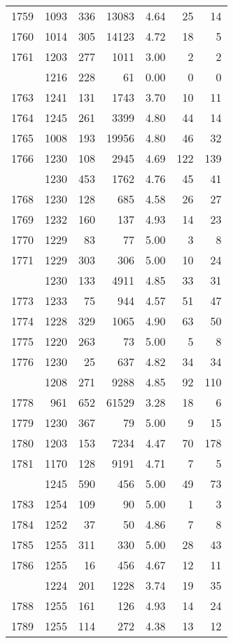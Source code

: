\documentclass[
]{article}
\begin{document}
\begin{table}
\begin{tabular}[t]{lrrrrrr}
1759 & 1093 & 336 & 13083 & 4.64 & 25 & 14\\
1760 & 1014 & 305 & 14123 & 4.72 & 18 & 5\\
1761 & 1203 & 277 & 1011 & 3.00 & 2 & 2\\
\addlinespace
1762 & 1216 & 228 & 61 & 0.00 & 0 & 0\\
1763 & 1241 & 131 & 1743 & 3.70 & 10 & 11\\
1764 & 1245 & 261 & 3399 & 4.80 & 44 & 14\\
1765 & 1008 & 193 & 19956 & 4.80 & 46 & 32\\
1766 & 1230 & 108 & 2945 & 4.69 & 122 & 139\\
\addlinespace
1767 & 1230 & 453 & 1762 & 4.76 & 45 & 41\\
1768 & 1230 & 128 & 685 & 4.58 & 26 & 27\\
1769 & 1232 & 160 & 137 & 4.93 & 14 & 23\\
1770 & 1229 & 83 & 77 & 5.00 & 3 & 8\\
1771 & 1229 & 303 & 306 & 5.00 & 10 & 24\\
\addlinespace
1772 & 1230 & 133 & 4911 & 4.85 & 33 & 31\\
1773 & 1233 & 75 & 944 & 4.57 & 51 & 47\\
1774 & 1228 & 329 & 1065 & 4.90 & 63 & 50\\
1775 & 1220 & 263 & 73 & 5.00 & 5 & 8\\
1776 & 1230 & 25 & 637 & 4.82 & 34 & 34\\
\addlinespace
1777 & 1208 & 271 & 9288 & 4.85 & 92 & 110\\
1778 & 961 & 652 & 61529 & 3.28 & 18 & 6\\
1779 & 1230 & 367 & 79 & 5.00 & 9 & 15\\
1780 & 1203 & 153 & 7234 & 4.47 & 70 & 178\\
1781 & 1170 & 128 & 9191 & 4.71 & 7 & 5\\
\addlinespace
1782 & 1245 & 590 & 456 & 5.00 & 49 & 73\\
1783 & 1254 & 109 & 90 & 5.00 & 1 & 3\\
1784 & 1252 & 37 & 50 & 4.86 & 7 & 8\\
1785 & 1255 & 311 & 330 & 5.00 & 28 & 43\\
1786 & 1255 & 16 & 456 & 4.67 & 12 & 11\\
\addlinespace
1787 & 1224 & 201 & 1228 & 3.74 & 19 & 35\\
1788 & 1255 & 161 & 126 & 4.93 & 14 & 24\\
1789 & 1255 & 114 & 272 & 4.38 & 13 & 12\\

\end{tabular}
\end{table}
\end{document}
